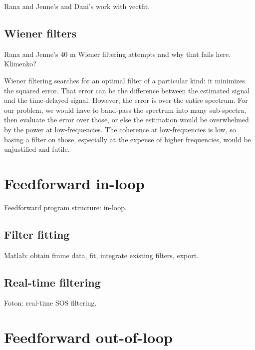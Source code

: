             Rana and Jenne's and Dani's work with vectfit.

        \subsection{Wiener filters}
        \label{wiener_filters}

            Rana and Jenne's 40 m Wiener filtering attempts \cite{Driggers2012ActiveNoise} and why that fails here. Klimenko?

            Wiener filtering searches for an optimal filter of a particular kind: it minimizes the squared error. That error can be the difference between the estimated signal and the time-delayed signal. However, the error is over the entire spectrum. For our problem, we would have to band-pass the spectrum into many sub-spectra, then evaluate the error over those, or else the estimation would be overwhelmed by the power at low-frequencies. The coherence at low-frequencies is low, so basing a filter on those, especially at the expense of higher frequencies, would be unjustified and futile.

    \section{Feedforward in-loop}
    \label{in-loop}

        Feedforward program structure: in-loop.

        \subsection{Filter fitting}
        \label{filter_fitting_in-loop}

            Matlab: obtain frame data, fit, integrate existing filters, export.

        \subsection{Real-time filtering}
        \label{real-time}
      
            Foton: real-time SOS filtering.

    \section{Feedforward out-of-loop}
    \label{out-of-loop}

